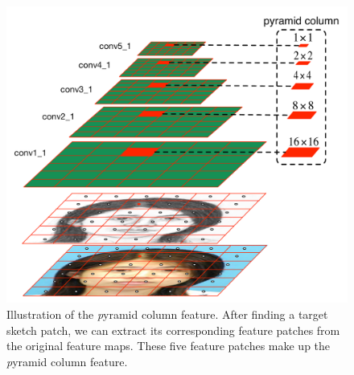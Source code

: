 \documentclass[10pt,twocolumn,letterpaper]{article}
\def\blue[#1]{{#1}}
\newcommand\ken[1]{{\small \textcolor{red}{\emph{}}}}
\begin{document}
\begin{figure}[htbp]
\centering
\includegraphics[width=0.85\linewidth]{img/pyramidcolumn.pdf}
\caption{\blue[Illustration of the \emph{pyramid column feature}. After finding a target sketch patch, we can extract its corresponding feature patches from the original feature maps. These five feature patches make up the \emph{pyramid column feature.}] \ken{rewrite this caption}}
\label{fig:pyramidcolumn}
\end{figure}

\end{document}
